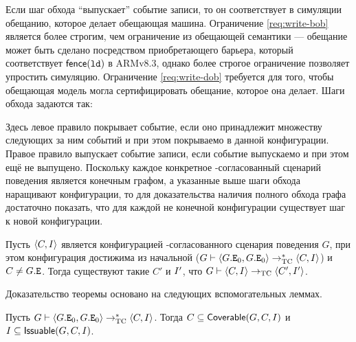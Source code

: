 Если шаг обхода  ``выпускает'' событие записи, то он соответствует в симуляции обещанию, которое делает обещающая машина.
Ограничение \ref{req:write-bob} является более строгим, чем ограничение из обещающей семантики ---
обещание может быть сделано  посредством приобретающего барьера, который соответствует $\mathsf{fence}({\mathtt{ld}})$ в ARMv8.3,
однако более строгое ограничение позволяет упростить симуляцию.
Ограничение \ref{req:write-dob} требуется для того, чтобы обещающая модель могла сертифицировать обещание, которое она
делает.
Шаги обхода задаются так:
Здесь левое правило покрывает событие, если оно принадлежит множеству
следующих за ним событий и при этом покрываемо в данной конфигурации.
Правое правило выпускает событие записи, если событие выпускаемо и при этом ещё не выпущено.
Поскольку каждое конкретное \ARM-согласованный сценарий поведения
является конечным графом,
а указанные выше шаги обхода наращивают конфигурации, то для доказательства наличия полного
обхода графа достаточно показать, что для каждой не конечной конфигурации существует шаг к новой конфигурации.
\begin{theorem}
  \label{prop:trav-step}
  Пусть ${\langle{C, I}\rangle}$ является конфигурацией \ARM-согласованного сценария поведения $G$,
  при этом конфигурация достижима из начальной
  ($G \vdash {\langle{G.{\mathtt{E}}_0, G.{\mathtt{E}}_0}\rangle} \rightarrow_{\rm TC}^{*} {\langle{C, I}\rangle}$) и $C \neq G.{\mathtt{E}}$.
  Тогда существуют такие $C'$ и $I'$, что
  $G \vdash {\langle{C, I}\rangle} \rightarrow_{\rm TC} {\langle{C', I'}\rangle}$.
\end{theorem}
Доказательство теоремы основано на следующих вспомогательных леммах.%
\begin{lemma}
  \label{prop:trav-prop-preserve}
  Пусть $G \vdash {\langle{G.{\mathtt{E}}_0, G.{\mathtt{E}}_0}\rangle} \rightarrow_{\rm TC}^{*} {\langle{C, I}\rangle}$.
  Тогда $C \subseteq {\sf Coverable}(G,C,I)$ и $I \subseteq {\sf Issuable}(G,C,I)$.
\end{lemma}
